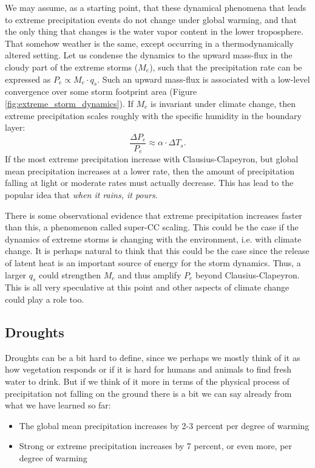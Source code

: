 \documentclass[12pt]{book}
\begin{document}
We may assume, as a starting point, that these dynamical phenomena that leads to extreme precipitation events do not change under global warming, and that the only thing that changes is the water vapor content in the lower troposphere. That somehow weather is the same, except occurring in a thermodynamically altered setting. Let us condense the dynamics to the upward mass-flux in the cloudy part of the extreme storms ($M_e$), such that the precipitation rate can be expressed as $P_e \propto M_e \cdot q_s$. Such an upward mass-flux is associated with a low-level convergence over some storm footprint area (Figure \ref{fig:extreme_storm_dynamics}). If $M_e$ is invariant under climate change, then extreme precipitation scales roughly with the specific humidity in the boundary layer:
$$ \frac{\Delta P_e}{P_e} \approx \alpha \cdot \Delta T_s.  $$
If the most extreme precipitation increase with Clausius-Clapeyron, but global mean precipitation increases at a lower rate, then the amount of precipitation falling at light or moderate rates must actually decrease. This has lead to the popular idea that {\em when it rains, it pours}.

There is some observational evidence that extreme precipitation increases faster than this, a phenomenon called super-CC scaling. This could be the case if the dynamics of extreme storms is changing with the environment, i.e. with climate change. It is perhaps natural to think that this could be the case since the release of latent heat is an important source of energy for the storm dynamics. Thus, a larger $q_s$ could strengthen $M_e$ and thus amplify $P_e$ beyond Clausius-Clapeyron.  This is all very speculative at this point and other aspects of climate change could play a role too.

\subsection{Droughts}
Droughts can be a bit hard to define, since we perhaps we mostly think of it as how vegetation responds or if it is hard for humans and animals to find fresh water to drink. But if we think of it more in terms of the physical process of precipitation not falling on the ground there is a bit we can say already from what we have learned so far:

\begin{itemize}
\item The global mean precipitation increases by 2-3 percent per degree of warming
\item Strong or extreme precipitation increases by 7  percent, or even more, per degree of warming
\end{itemize}
\end{document}
